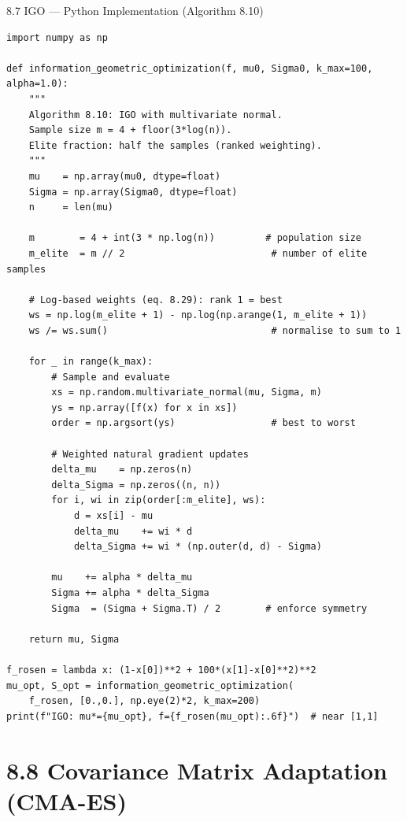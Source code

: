 \documentclass[aspectratio=169,10pt]{beamer}
\begin{document}
\begin{frame}[fragile]{8.7 IGO --- Python Implementation (Algorithm 8.10)}
\begin{lstlisting}[caption={Information-geometric optimisation with multivariate Gaussian}]
import numpy as np

def information_geometric_optimization(f, mu0, Sigma0, k_max=100, alpha=1.0):
    """
    Algorithm 8.10: IGO with multivariate normal.
    Sample size m = 4 + floor(3*log(n)).
    Elite fraction: half the samples (ranked weighting).
    """
    mu    = np.array(mu0, dtype=float)
    Sigma = np.array(Sigma0, dtype=float)
    n     = len(mu)

    m        = 4 + int(3 * np.log(n))         # population size
    m_elite  = m // 2                          # number of elite samples

    # Log-based weights (eq. 8.29): rank 1 = best
    ws = np.log(m_elite + 1) - np.log(np.arange(1, m_elite + 1))
    ws /= ws.sum()                             # normalise to sum to 1

    for _ in range(k_max):
        # Sample and evaluate
        xs = np.random.multivariate_normal(mu, Sigma, m)
        ys = np.array([f(x) for x in xs])
        order = np.argsort(ys)                 # best to worst

        # Weighted natural gradient updates
        delta_mu    = np.zeros(n)
        delta_Sigma = np.zeros((n, n))
        for i, wi in zip(order[:m_elite], ws):
            d = xs[i] - mu
            delta_mu    += wi * d
            delta_Sigma += wi * (np.outer(d, d) - Sigma)

        mu    += alpha * delta_mu
        Sigma += alpha * delta_Sigma
        Sigma  = (Sigma + Sigma.T) / 2        # enforce symmetry

    return mu, Sigma

f_rosen = lambda x: (1-x[0])**2 + 100*(x[1]-x[0]**2)**2
mu_opt, S_opt = information_geometric_optimization(
    f_rosen, [0.,0.], np.eye(2)*2, k_max=200)
print(f"IGO: mu*={mu_opt}, f={f_rosen(mu_opt):.6f}")  # near [1,1]
\end{lstlisting}
\end{frame}

\section{8.8 Covariance Matrix Adaptation (CMA-ES)}
\end{document}
